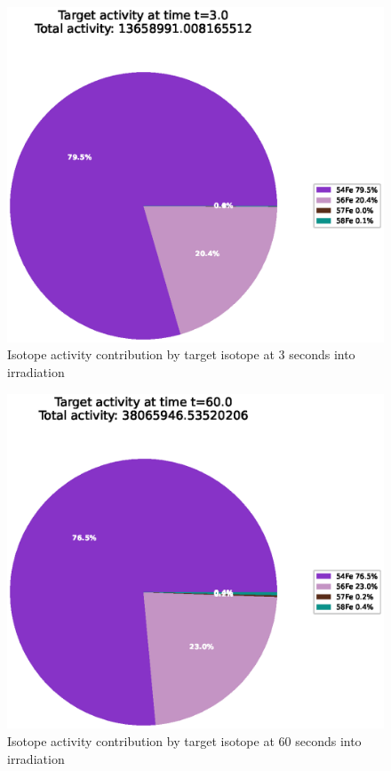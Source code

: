 \FloatBarrier


\begin{figure}[!htb]
\centering
\includegraphics[width=0.8\linewidth]{chapters/activity_code/fe-activity-v2/target-activity/0001_3.eps}
\caption{Isotope activity contribution by target isotope at 3 seconds into irradiation}
\label{fig:activity-v2-target-activity-3s}
\end{figure}

\begin{figure}[!htb]
\centering
\includegraphics[width=0.8\linewidth]{chapters/activity_code/fe-activity-v2/target-activity/0020_60.eps}
\caption{Isotope activity contribution by target isotope at 60 seconds into irradiation}
\label{fig:activity-v2-target-activity-60s}
\end{figure}

